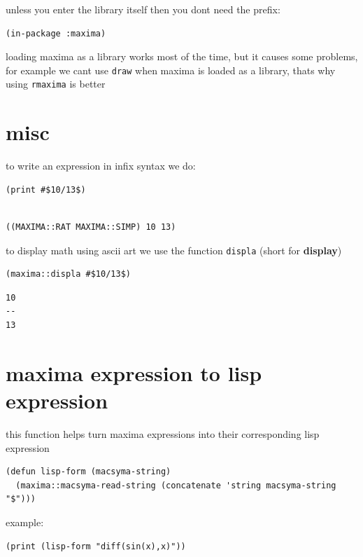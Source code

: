 \documentclass[a4paper,12pt]{article}
\begin{document}
unless you enter the library itself then you dont need the prefix:\\
\lstset{language=Lisp,label= ,caption= ,captionpos=b,numbers=none}
\begin{lstlisting}
(in-package :maxima)
\end{lstlisting}
loading maxima as a library works most of the time, but it causes some problems, for example we cant use \texttt{draw} when maxima is loaded as a library, thats why using \texttt{rmaxima} is better\\
\section{misc}
\label{sec:orgac397ad}
to write an expression in infix syntax we do:\\
\lstset{language=Lisp,label= ,caption= ,captionpos=b,numbers=none}
\begin{lstlisting}
(print #$10/13$)
\end{lstlisting}

\begin{verbatim}

((MAXIMA::RAT MAXIMA::SIMP) 10 13) 
\end{verbatim}


to display math using ascii art we use the function \texttt{displa} (short for \textbf{display})\\
\lstset{language=Lisp,label= ,caption= ,captionpos=b,numbers=none}
\begin{lstlisting}
(maxima::displa #$10/13$)
\end{lstlisting}

\begin{verbatim}
10
--
13
\end{verbatim}
\section{maxima expression to lisp expression}
\label{sec:orgcb5abc7}
this function helps turn maxima expressions into their corresponding lisp expression\\
\lstset{language=Lisp,label= ,caption= ,captionpos=b,numbers=none}
\begin{lstlisting}
(defun lisp-form (macsyma-string)
  (maxima::macsyma-read-string (concatenate 'string macsyma-string "$")))
\end{lstlisting}

example:\\
\lstset{language=Lisp,label= ,caption= ,captionpos=b,numbers=none}
\begin{lstlisting}
(print (lisp-form "diff(sin(x),x)"))
\end{lstlisting}
\end{document}
